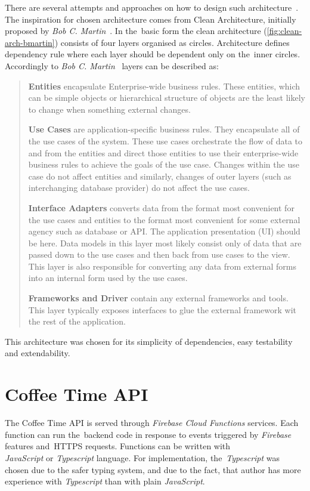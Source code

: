 There are several attempts and approaches on how to design such architecture~\cite{clean-architecture-article}. The inspiration for chosen architecture comes from Clean Architecture, initially proposed by \textit{Bob C. Martin}~\cite{clean-architecture-book}. In the~basic form the clean architecture (\cref{fig:clean-arch-bmartin}) consists of four layers organised as circles. Architecture defines dependency rule where each layer should be dependent only on the~inner circles. Accordingly to \textit{Bob C. Martin}~\cite{clean-architecture-article} layers can be described as:  

\begin{quote}
\textbf{Entities} encapsulate Enterprise-wide business rules. These entities, which can be simple objects or hierarchical structure of objects are the least likely to change when something external changes.

\textbf{Use Cases} are application-specific business rules. They encapsulate all of the use cases of the system. These use cases orchestrate the flow of data to and from the entities and direct those entities to use their enterprise-wide business rules to achieve the goals of the use case. Changes within the use case do not affect entities and similarly, changes of outer layers (such as interchanging database provider) do not affect the use cases. 

\textbf{Interface Adapters} converts data from the format most convenient for the use cases and entities to the format most convenient for some external agency such as database or API.  The application presentation (UI) should be here. Data models in this layer most likely consist only of data that are passed down to the use cases and then back from use cases to the view.  This layer is also responsible for converting any data from external forms into an internal form used by the use cases.

\textbf{Frameworks and Driver} contain any external frameworks and tools. This layer typically exposes interfaces to glue the external framework wit the rest of the application. 
\end{quote}

This architecture was chosen for its simplicity of dependencies, easy testability and extendability. 
\section{Coffee Time API}
The Coffee Time API is served through \textit{Firebase Cloud Functions} services. Each function can run the~backend code in response to events triggered by \textit{Firebase} features and~HTTPS requests. Functions can be written with \\\textit{JavaScript} or \textit{Typescript} language. For implementation, the~\textit{Typescript} was chosen due to the safer typing system, and due to the fact, that author has more experience with \textit{Typescript} than with plain \textit{JavaScript}. 

